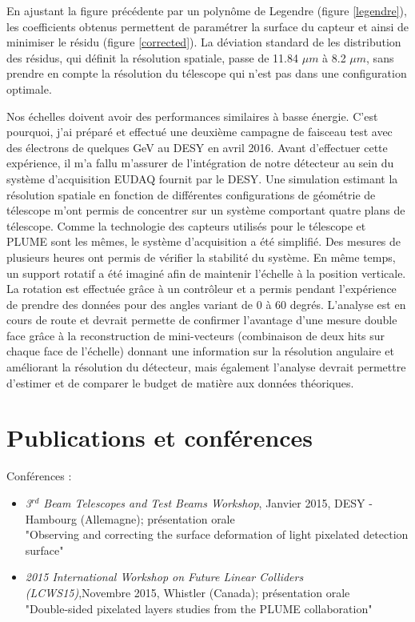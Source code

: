 \documentclass[a4papper, 10pt]{article}
\begin{document}
  En ajustant la figure précédente par un polynôme de Legendre (figure \ref{legendre}), les coefficients obtenus permettent de paramétrer la surface du capteur et ainsi de minimiser le résidu (figure \ref{corrected}). 
  La déviation standard de les distribution des résidus, qui définit la résolution spatiale, passe de 11.84 $\mu m$ à 8.2 $\mu m$, sans prendre en compte la résolution du télescope qui n'est pas dans une configuration optimale.

  Nos échelles doivent avoir des performances similaires à basse énergie.
  C'est pourquoi, j'ai préparé et effectué une deuxième campagne de faisceau test avec des électrons de quelques GeV au DESY en avril 2016.
  Avant d'effectuer cette expérience, il m'a fallu m'assurer de l'intégration de notre détecteur au sein du système d'acquisition EUDAQ fournit par le DESY. 
  Une simulation estimant la résolution spatiale en fonction de différentes configurations de géométrie de télescope m'ont permis de concentrer sur un système comportant quatre plans de télescope.
  Comme la technologie des capteurs utilisés pour le télescope et PLUME sont les mêmes, le système d'acquisition a été simplifié. 
  Des mesures de plusieurs heures ont permis de vérifier la stabilité du système. 
  En même temps, un support rotatif a été imaginé afin de maintenir l'échelle à la position verticale.
  La rotation est effectuée grâce à un contrôleur et a permis pendant l'expérience de prendre des données pour des angles variant de 0 à 60 degrés. 
  L'analyse est en cours de route et devrait permette de confirmer l'avantage d'une mesure double face grâce à la reconstruction de mini-vecteurs (combinaison de deux hits sur chaque face de l'échelle) donnant une information sur la résolution angulaire et améliorant la résolution du détecteur, mais également l'analyse devrait permettre d'estimer et de comparer le budget de matière aux données théoriques.
   

  \section*{Publications et conférences}

  Conférences :
  \begin{itemize}
    \item \textit{3$^{rd}$ Beam Telescopes and Test Beams Workshop}, Janvier 2015, DESY - Hambourg (Allemagne); présentation orale\\
    "Observing and correcting the surface deformation of light pixelated detection surface"
    \item \textit{2015 International Workshop on Future Linear Colliders (LCWS15)},Novembre 2015,  Whistler (Canada); présentation orale\\
    "Double-sided pixelated layers studies from the PLUME collaboration"

  \end{itemize}
\end{document}
